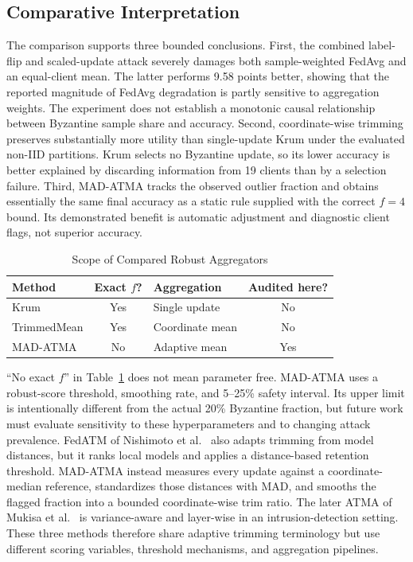 \documentclass[10pt,letterpaper]{article}
\begin{document}
\subsection{Comparative Interpretation}

The comparison supports three bounded conclusions. First, the combined
label-flip and scaled-update attack severely damages both sample-weighted FedAvg
and an equal-client mean. The latter performs 9.58 points better, showing that
the reported magnitude of FedAvg degradation is partly sensitive to aggregation
weights. The experiment does not establish a monotonic causal relationship
between Byzantine sample share and accuracy. Second, coordinate-wise trimming
preserves substantially more utility than single-update Krum under the
evaluated non-IID partitions. Krum selects no Byzantine update, so its lower
accuracy is better explained by discarding information from 19 clients than by
a selection failure. Third, MAD-ATMA tracks the observed outlier fraction and
obtains essentially the same final accuracy as a static rule supplied with the
correct $f=4$ bound. Its demonstrated benefit is automatic adjustment and
diagnostic client flags, not superior accuracy.

\begin{table}[t]
\caption{Scope of Compared Robust Aggregators}
\label{tab:method_scope}
\centering
\scriptsize
\begin{tabular}{lclc}
\toprule
Method & Exact $f$? & Aggregation & Audited here?\\
\midrule
Krum & Yes & Single update & No\\
TrimmedMean & Yes & Coordinate mean & No\\
MAD-ATMA & No & Adaptive mean & Yes\\
\bottomrule
\end{tabular}
\end{table}

``No exact $f$'' in Table~\ref{tab:method_scope} does not mean parameter free.
MAD-ATMA uses a robust-score threshold, smoothing rate, and 5--25\% safety
interval. Its upper limit is intentionally different from the actual 20\%
Byzantine fraction, but future work must evaluate sensitivity to these
hyperparameters and to changing attack prevalence. FedATM of Nishimoto et
al.~\cite{nishimoto2023} also adapts trimming from model distances, but it ranks
local models and applies a distance-based retention threshold. MAD-ATMA instead
measures every update against a coordinate-median reference, standardizes those
distances with MAD, and smooths the flagged fraction into a bounded
coordinate-wise trim ratio. The later ATMA of Mukisa et
al.~\cite{mukisa2025} is variance-aware and layer-wise in an
intrusion-detection setting. These three methods therefore share adaptive
trimming terminology but use different scoring variables, threshold mechanisms,
and aggregation pipelines.
\end{document}
